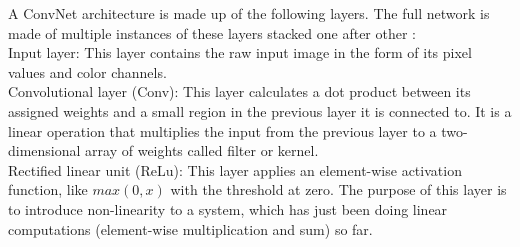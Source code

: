 A ConvNet architecture is made up of the following layers. The full network is made of multiple instances of these layers stacked one after other \cite{krizhevsky2012imagenet}: \\
Input layer: This layer contains the raw input image in the form of its pixel values and color channels.\\
Convolutional layer (Conv): This layer calculates a dot product between its assigned weights and a small region in the previous layer it is connected to. It is a linear operation that multiplies the input from the previous layer to a two-dimensional array of weights called filter or kernel. \\
Rectified linear unit (ReLu): This layer applies an element-wise activation function, like $max(0,x)$ with the threshold at zero. The purpose of this layer is to introduce non-linearity to a system, which has just been doing linear computations (element-wise multiplication and sum) so far. \\
